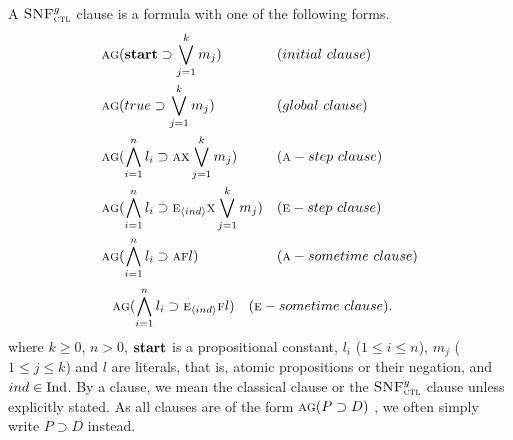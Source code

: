 \documentclass[letterpaper]{article} %
\begin{document}

A ${\textsc{SNF}_{\textsc{ctl}}^g}$ clause is a formula with one of the following forms. 
\begin{align*}
& \ALL \GLOBAL(\start \supset \bigvee_{j=1}^k m_j) && (initial\ clause) \\
& \ALL \GLOBAL(true \supset \bigvee_{j=1}^k m_j) && (global\ clause) \\
& \ALL \GLOBAL(\bigwedge_{i=1}^n l_i \supset \ALL \NEXT \bigvee_{j=1}^k m_j) && (\ALL-step\ clause)\\
& \ALL \GLOBAL(\bigwedge_{i=1}^n l_i \supset \EXIST_\tuple{ind} \NEXT \bigvee_{j=1}^k m_j) && (\EXIST-step\ clause)\\
& \ALL \GLOBAL(\bigwedge_{i=1}^n l_i \supset \ALL \FUTURE l) && (\ALL-sometime\ clause)
\end{align*}
\begin{align*}
& \textsc{a} \textsc{g}(\bigwedge_{i=1}^n l_i \supset \textsc{e}_{{\langle{ind}\rangle}} \textsc{f} l) && (\textsc{e}-sometime\ clause).
\end{align*}
where $k \ge 0$, $n > 0$, $\textbf{start}$ is a propositional constant, $l_i$ ($1 \le i \le n$), $m_j$ ($1 \le j \le k$) and $l$ are literals, that is, atomic propositions or their negation, and $ind\in \textrm{Ind}$. %
By a clause, we mean the classical clause or the ${\textsc{SNF}_{\textsc{ctl}}^g}$ clause unless explicitly stated.
As all clauses are of the form $\textsc{a} \textsc{g}(P \supset D)$ , we often simply write $P \supset D$ instead.
\end{document}
